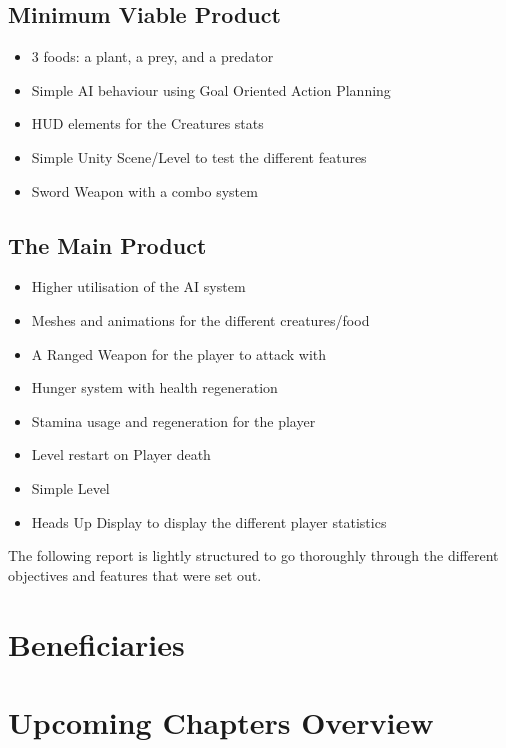 \documentclass[11pt]{report}
\begin{document}
\subsection{Minimum Viable Product}
\begin{itemize}
    \item 3 foods: a plant, a prey, and a predator
    \item Simple AI behaviour using Goal Oriented Action Planning
    \item HUD elements for the Creatures stats
    \item Simple Unity Scene/Level to test the different features
    \item Sword Weapon with a combo system
\end{itemize}
\subsection{The Main Product}
\begin{itemize}
    \item Higher utilisation of the AI system
    \item Meshes and animations for the different creatures/food
    \item A Ranged Weapon for the player to attack with
    \item Hunger system with health regeneration
    \item Stamina usage and regeneration for the player
    \item Level restart on Player death
    \item Simple Level
    \item Heads Up Display to display the different player statistics
\end{itemize}
The following report is lightly structured to go thoroughly through the different objectives and features that were set out.


\section{Beneficiaries}

\section{Upcoming Chapters Overview}
\end{document}
